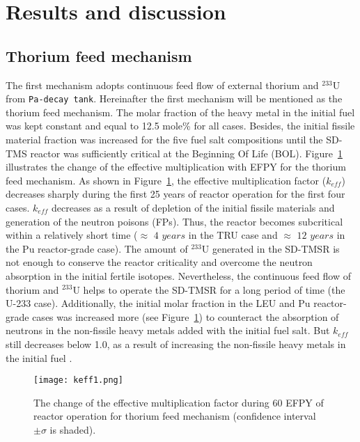 \section{Results and discussion} \label{Results-and-discussion}

\subsection{Thorium feed mechanism}

The first mechanism adopts continuous feed flow of external thorium and $^{233}$U from \texttt{Pa-decay tank}. Hereinafter the first mechanism will be mentioned as the thorium feed mechanism. The molar fraction of the heavy metal in the initial fuel was kept constant and equal to 12.5 mole\% for all cases. Besides, the initial fissile material fraction was increased for the five fuel salt compositions until the SD-TMS reactor was sufficiently critical at the Beginning Of Life (BOL). 
Figure~\ref{fig:keff1} illustrates the change of the effective multiplication with \gls{EFPY} for the thorium feed mechanism. As shown in Figure~\ref{fig:keff1}, the effective multiplication factor ($k_{eff}$) decreases sharply during the first 25 years of reactor operation for the first four cases. $k_{eff}$ decreases as a result of depletion of the initial fissile materials and generation of the neutron poisons (FPs). Thus, the reactor becomes subcritical within a relatively short time ($\approx$ $4$ $years$ in the \gls{TRU} case and $\approx$ $12$ $years$ in the Pu reactor-grade case). The amount of $^{233}$U generated in the \gls{SD-TMSR} is not enough to conserve the reactor criticality and overcome the neutron absorption in the initial fertile isotopes. Nevertheless, the continuous feed flow of thorium and $^{233}$U helps to operate the \gls{SD-TMSR} for a long period of time (the U-233 case). Additionally, the initial molar fraction in the LEU and Pu reactor-grade cases was increased more (see Figure~\ref{fig:keff1}) to counteract the absorption of neutrons in the non-fissile heavy metals added with the initial fuel salt. But $k_{eff}$ still decreases below 1.0, as a result of increasing the non-fissile heavy metals in the initial fuel \cite{betzler2016modeling}.

\begin{figure}
	\centering
	\texttt{[image: keff1.png]}
	\caption{The change of the effective multiplication factor during 60 \gls{EFPY} of reactor operation for thorium feed mechanism (confidence interval $\pm\sigma$ is shaded).} 
	\label{fig:keff1}
\end{figure}

